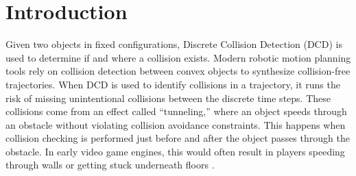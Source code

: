 \section{Introduction}\label{sec:cdcol:introduction}
%
%
%
%
%
Given two objects in fixed configurations, Discrete Collision Detection (DCD) is used to determine if and where a collision exists. Modern robotic motion planning tools rely on collision detection between convex objects to synthesize collision-free trajectories. When DCD is used to identify collisions in a trajectory, it runs the risk of missing unintentional collisions between the discrete time steps. These collisions come from an effect called ``tunneling,'' where an object speeds through an obstacle without violating collision avoidance constraints. This happens when collision checking is performed just before and after the object passes through the obstacle. In early video game engines, this would often result in players speeding through walls or getting stuck underneath floors \cite{ericson2004}.
%
%

